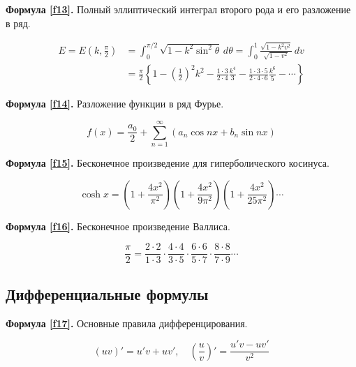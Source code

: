 \documentclass[a4paper,12pt]{article}
\begin{document}
\vspace{15pt}
\textbf{Формула \ref{f13}.}
Полный эллиптический интеграл второго рода и его разложение в ряд.

\begin{equation}
\begin{split}
E=E\left(k,\frac{\pi}{2}\right)&=\int_{0}^{\pi/2}\sqrt{1-k^2\sin^2\theta}\,d\theta=
\int_{0}^{1}\frac{\sqrt{1-k^2v^2}}{\sqrt{1-v^2}}\,dv\\[8pt]&=\frac{\pi}{2}\left\{1
-\left(\frac{1}{2}\right)^2k^2-\frac{1\cdot3}{2\cdot4}\frac{k^4}{3}-\frac{1\cdot3\cdot5}{2\cdot4\cdot6}\frac{k^6}{5}
-\cdots\right\}
\end{split}
\label{f13}
\end{equation}


\vspace{15pt}
\textbf{Формула \ref{f14}.}
Разложение функции в ряд Фурье.

\begin{equation}
f(x)=\frac{a_0}{2}+\sum_{n=1}^{\infty}\left(a_n\cos nx+b_n\sin nx\right)
\label{f14}
\end{equation}


\vspace{15pt}
\textbf{Формула \ref{f15}.}
Бесконечное произведение для гиперболического косинуса.

\begin{equation}
\cosh x=\left(1+\frac{4x^2}{\pi^2}\right)\left(1+\frac{4x^2}{9\pi^2}\right)\left(1+\frac{4x^2}{25\pi^2}\right)\cdots
\label{f15}
\end{equation}


\vspace{15pt}
\textbf{Формула \ref{f16}.}
Бесконечное произведение Валлиса.

\begin{equation}
\frac{\pi}{2}=\frac{2\cdot2}{1\cdot3}\cdot\frac{4\cdot4}{3\cdot5}\cdot\frac{6\cdot6}{5\cdot7}\cdot\frac{8\cdot8}{7\cdot9}\cdots
\label{f16}
\end{equation}


\subsection{Дифференциальные формулы}
\vspace{15pt}
\textbf{Формула \ref{f17}.}
Основные правила дифференцирования.

\begin{equation}
(uv)'=u'v+uv', \quad \left(\frac{u}{v}\right)'=\frac{u'v-uv'}{v^2}
\label{f17}
\end{equation}
\end{document}

